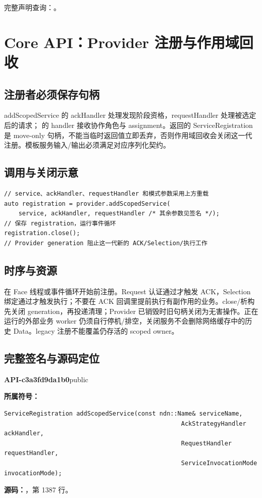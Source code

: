 完整声明查询：。

\section{Core API：Provider 注册与作用域回收}

\subsection{注册者必须保存句柄}
addScopedService 的 ackHandler 处理发现阶段资格，requestHandler 处理被选定后的请求； 的 handler 接收协作角色与 assignment。返回的 ServiceRegistration 是 move-only 句柄，不能当临时返回值立即丢弃，否则作用域回收会关闭这一代注册。模板服务输入/输出必须满足对应序列化契约。

\subsection{调用与关闭示意}

\begin{Verbatim}[fontsize=\footnotesize,breaklines,breakanywhere]
// service、ackHandler、requestHandler 和模式参数采用上方重载
auto registration = provider.addScopedService(
    service, ackHandler, requestHandler /* 其余参数见签名 */);
// 保存 registration，运行事件循环
registration.close();
// Provider generation 阻止这一代新的 ACK/Selection/执行工作
\end{Verbatim}

\subsection{时序与资源}
在 Face 线程或事件循环开始前注册。Request 认证通过才触发 ACK，Selection 绑定通过才触发执行；不要在 ACK 回调里提前执行有副作用的业务。close/析构先关闭 generation，再投递清理；Provider 已销毁时旧句柄关闭为无害操作。正在运行的外部业务 worker 仍须自行停机/排空，关闭服务不会删除网络缓存中的历史 Data。legacy 注册不能覆盖仍存活的 scoped owner。

\subsection{完整签名与源码定位}

\textbf{API-c3a3fd9da1b0}\quad public\par
\textbf{所属符号：}\par
\begin{Verbatim}[fontsize=\footnotesize,breaklines,breakanywhere]
ServiceRegistration addScopedService(const ndn::Name& serviceName,
                                                 AckStrategyHandler ackHandler,
                                                 RequestHandler requestHandler,
                                                 ServiceInvocationMode invocationMode);
\end{Verbatim}
\textbf{源码：}，第 1387 行。\par

